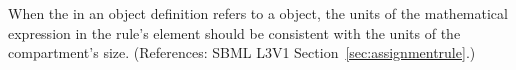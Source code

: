 When the  in an \AssignmentRule object definition refers to
a \Compartment object, the units of the mathematical expression in the
rule's  element should be consistent with the units of the
compartment's size.  (References: SBML L3V1
Section~\ref{sec:assignmentrule}.)
